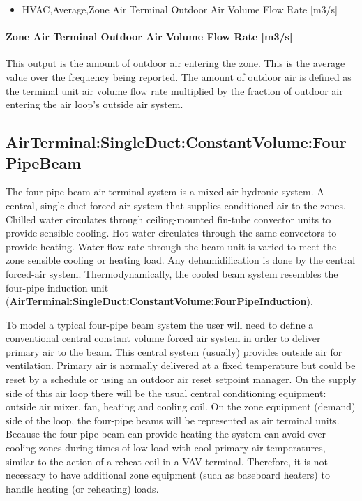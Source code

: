 \begin{itemize}
\item
  HVAC,Average,Zone Air Terminal Outdoor Air Volume Flow Rate {[}m3/s{]}
\end{itemize}

\paragraph{Zone Air Terminal Outdoor Air Volume Flow Rate {[}m3/s{]}}

This output is the amount of outdoor air entering the zone. This is the average value over the frequency being reported. The amount of outdoor air is defined as the terminal unit air volume flow rate multiplied by the fraction of outdoor air entering the air loop's outside air system.

\subsection{AirTerminal:SingleDuct:ConstantVolume:FourPipeBeam}\label{airterminalsingleductconstantvolumefourpipebeam}

The four-pipe beam air terminal system is a mixed air-hydronic system. A central, single-duct forced-air system that supplies conditioned air to the zones. Chilled water circulates through ceiling-mounted fin-tube convector units to provide sensible cooling. Hot water circulates through the same convectors to provide heating. Water flow rate through the beam unit is varied to meet the zone sensible cooling or heating load. Any dehumidification is done by the central forced-air system. Thermodynamically, the cooled beam system resembles the four-pipe induction unit (\textbf{\hyperref[airterminalsingleductconstantvolumefourpipeinduction]{AirTerminal:SingleDuct:ConstantVolume:FourPipeInduction}}).

To model a typical four-pipe beam system the user will need to define a conventional central constant volume forced air system in order to deliver primary air to the beam. This central system (usually) provides outside air for ventilation. Primary air is normally delivered at a fixed temperature but could be reset by a schedule or using an outdoor air reset setpoint manager. On the supply side of this air loop there will be the usual central conditioning equipment: outside air mixer, fan, heating and cooling coil. On the zone equipment (demand) side of the loop, the four-pipe beams will be represented as air terminal units. Because the four-pipe beam can provide heating the system can avoid over-cooling zones during times of low load with cool primary air temperatures, similar to the action of a reheat coil in a VAV terminal. Therefore, it is not necessary to have additional zone equipment (such as baseboard heaters) to handle heating (or reheating) loads.

